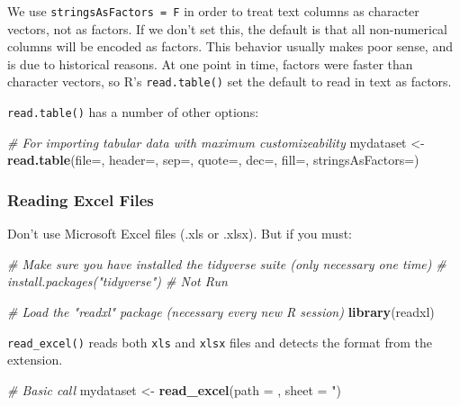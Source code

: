 \documentclass[]{book}
\newenvironment{Shaded}{\begin{snugshade}}{\end{snugshade}}
\newcommand{\KeywordTok}[1]{\textcolor[rgb]{0.13,0.29,0.53}{\textbf{#1}}}
\newcommand{\DataTypeTok}[1]{\textcolor[rgb]{0.13,0.29,0.53}{#1}}
\newcommand{\StringTok}[1]{\textcolor[rgb]{0.31,0.60,0.02}{#1}}
\newcommand{\CommentTok}[1]{\textcolor[rgb]{0.56,0.35,0.01}{\textit{#1}}}
\newcommand{\NormalTok}[1]{#1}
\begin{document}
We use \texttt{stringsAsFactors\ =\ F} in order to treat text columns as
character vectors, not as factors. If we don't set this, the default is
that all non-numerical columns will be encoded as factors. This behavior
usually makes poor sense, and is due to historical reasons. At one point
in time, factors were faster than character vectors, so R's
\texttt{read.table()} set the default to read in text as factors.

\texttt{read.table()} has a number of other options:

\begin{Shaded}
\begin{Highlighting}[]
\CommentTok{# For importing tabular data with maximum customizeability}
\NormalTok{mydataset <-}\StringTok{ }\KeywordTok{read.table}\NormalTok{(}\DataTypeTok{file=}\NormalTok{, }\DataTypeTok{header=}\NormalTok{, }\DataTypeTok{sep=}\NormalTok{, }\DataTypeTok{quote=}\NormalTok{, }\DataTypeTok{dec=}\NormalTok{, }\DataTypeTok{fill=}\NormalTok{, }\DataTypeTok{stringsAsFactors=}\NormalTok{)}
\end{Highlighting}
\end{Shaded}

\subsubsection*{Reading Excel Files}\label{reading-excel-files}

Don't use Microsoft Excel files (.xls or .xlsx). But if you must:

\begin{Shaded}
\begin{Highlighting}[]
\CommentTok{# Make sure you have installed the tidyverse suite (only necessary one time)}
\CommentTok{# install.packages("tidyverse") # Not Run}

\CommentTok{# Load the "readxl" package (necessary every new R session)}
\KeywordTok{library}\NormalTok{(readxl)}
\end{Highlighting}
\end{Shaded}

\texttt{read\_excel()} reads both \texttt{xls} and \texttt{xlsx} files
and detects the format from the extension.

\begin{Shaded}
\begin{Highlighting}[]
\CommentTok{# Basic call}
\NormalTok{mydataset <-}\StringTok{ }\KeywordTok{read_excel}\NormalTok{(}\DataTypeTok{path =}\NormalTok{ , }\DataTypeTok{sheet =} \StringTok{")}
\end{Highlighting}
\end{Shaded}
\end{document}
